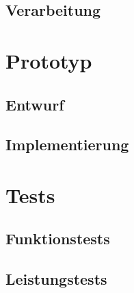 
\subsection{Verarbeitung}

\section{Prototyp}

\subsection{Entwurf}

\subsection{Implementierung}


\section{Tests}

\subsection{Funktionstests}

\subsection{Leistungstests}
